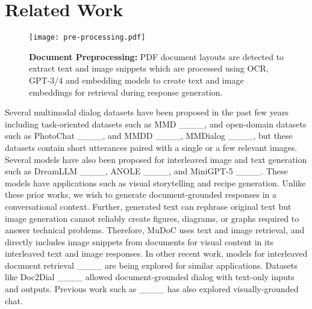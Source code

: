 \section{Related Work}
\begin{figure*}[t]
    \centering
    \texttt{[image: pre-processing.pdf]}
    \caption{\textbf{Document Preprocessing:} PDF document layouts are detected to extract text and image snippets which are processed using OCR, GPT-3/4 and embedding models to create text and image embeddings for retrieval during response generation.}
    \label{fig:preprocessing}
\end{figure*}

Several multimodal dialog datasets have been proposed in the past few years 
including task-oriented datasets such as 
MMD ____, 
and open-domain datasets such as 
PhotoChat ____, 
and
MMDD ____, 
MMDialog ____, but these datasets contain short utterances paired with a single or a few relevant images.
Several models have also been proposed for interleaved image and text generation such as
DreamLLM ____, 
ANOLE ____,
and
MiniGPT-5 ____. 
These models have applications such as visual storytelling and recipe generation.
Unlike these prior works, we wish to generate document-grounded responses in a conversational context. 
Further, generated text can rephrase original text but image generation cannot reliably create figures, diagrams, or graphs required to answer technical problems. 
Therefore, MuDoC uses text and image retrieval, and directly includes image snippets from documents for visual content in its interleaved text and image responses.
In other recent work, models for interleaved document retrieval ____ are being explored for similar applications.
Datasets like Doc2Dial ____ allowed document-grounded dialog with text-only inputs and outputs.  
Previous work such as ____ has also explored visually-grounded chat.